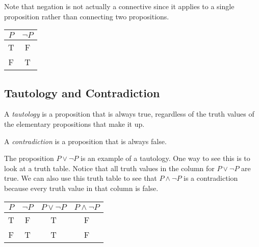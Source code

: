 Note that negation is not actually a connective since it applies to a single proposition rather than connecting two propositions.

\begin{center}
\begin{tabular}[t]{|c|c|}
\hline
$P$ & $\neg P$\\
\hline
\hline
T & F\\
\hline
F & T\\
\hline
\end{tabular}
\end{center}

\subsection{Tautology and Contradiction}

\begin{definition}
A \emph{tautology} is a proposition that is always true, regardless of the truth values of the elementary propositions that make it up.
\end{definition}

\begin{definition} 
A \emph{contradiction} is a proposition that is always false.
\end{definition}

\begin{example}
The proposition $P\lor \neg P$ is an example of a tautology.  One way to see this is to look at a truth table.  Notice that all truth values in the column for $P\lor \neg P$ are true.  We can also use this truth table to see that $P\land\neg P$ is a contradiction because every truth value in that column is false.

\begin{center}
\begin{tabular}[t]{|c|c|c|c|}
\hline
$P$ & $\neg P$ & $P\lor \neg P$ & $P\land \neg P$\\
\hline
\hline
T & F & T & F\\
\hline
F & T & T & F\\
\hline
\end{tabular}
\end{center}
\end{example}

